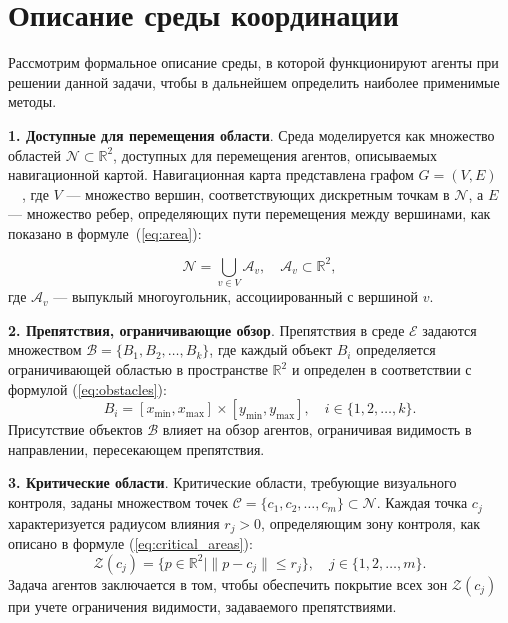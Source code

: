 \section{Описание среды координации}
Рассмотрим формальное описание среды, в которой функционируют агенты при решении данной задачи, чтобы в дальнейшем определить наиболее применимые методы.

\textbf{1. Доступные для перемещения области}.  
Среда моделируется как множество областей $\mathcal{N} \subset \mathbb{R}^2$, доступных для перемещения агентов, описываемых навигационной картой. Навигационная карта представлена графом $G = (V, E)$~\cite{overview-of-recent}~\cite{ieee-mas}, где $V$ — множество вершин, соответствующих дискретным точкам в $\mathcal{N}$, а $E$ — множество ребер, определяющих пути перемещения между вершинами, как показано в формуле~(\ref{eq:area}):

\begin{equation}
\mathcal{N} = \bigcup_{v \in V} \mathcal{A}_v, \quad \mathcal{A}_v \subset \mathbb{R}^2,
\label{eq:area}
\end{equation}
где $\mathcal{A}_v$ — выпуклый многоугольник, ассоциированный с вершиной $v$.

\textbf{2. Препятствия, ограничивающие обзор}.  
Препятствия в среде $\mathcal{E}$ задаются множеством $\mathcal{B} = \{B_1, B_2, \dots, B_k\}$, где каждый объект $B_i$ определяется ограничивающей областью в пространстве $\mathbb{R}^2$ и определен в соответствии с формулой (\ref{eq:obstacles}):
\begin{equation}
B_i = [x_{\min}, x_{\max}] \times [y_{\min}, y_{\max}], \quad i \in \{1, 2, \dots, k\}.
\label{eq:obstacles}
\end{equation}
Присутствие объектов $\mathcal{B}$ влияет на обзор агентов, ограничивая видимость в направлении, пересекающем препятствия.

\textbf{3. Критические области}.  
Критические области, требующие визуального контроля, заданы множеством точек $\mathcal{C} = \{c_1, c_2, \dots, c_m\} \subset \mathcal{N}$.
Каждая точка $c_j$ характеризуется радиусом влияния $r_j > 0$, определяющим зону контроля, как описано в формуле (\ref{eq:critical_areas}):
\begin{equation}
\mathcal{Z}(c_j) = \{p \in \mathbb{R}^2 \mid \|p - c_j\| \leq r_j\}, \quad j \in \{1, 2, \dots, m\}.
\label{eq:critical_areas}
\end{equation}
Задача агентов заключается в том, чтобы обеспечить покрытие всех зон $\mathcal{Z}(c_j)$ при учете ограничения видимости, задаваемого препятствиями.

